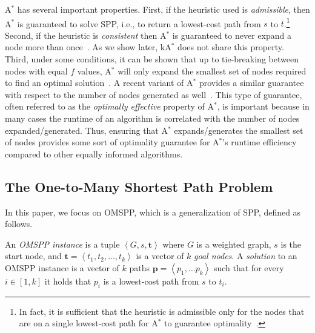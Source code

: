 \documentclass[smallextended]{svjour3}       %
\newcommand{\omspp}{\ac{OMSPP}\xspace}
\newcommand{\spp}{\ac{SPP}\xspace}
\newcommand{\astar}{A$^*$\xspace}
\newcommand{\kastar}{kA$^*$\xspace}
\newcommand{\tuple}[1]{\ensuremath{\left \langle #1 \right \rangle }}
\newcommand{\vect}[1]{\mathbf{#1}}
\newcommand{\roni}[1]{\textbf{[RS:#1]}}
\begin{document}
\astar has several important properties. 
First, if the heuristic used is \emph{admissible}, then \astar is guaranteed to solve SPP, i.e., to return a lowest-cost path from $s$ to $t$.\footnote{In fact, it is sufficient that the heuristic is admissible only for the nodes that are on a single lowest-cost path for \astar to guarantee optimality~\cite{karpas2012optimal,dechter1985generalizedBestFirst}.}
Second, if the heuristic is \emph{consistent} then \astar is guaranteed to never expand a node more than once~\cite{hartNR68Astar}. As we show later, \kastar does not share this property. %
Third, under some conditions, it can be shown that up to tie-breaking between nodes with equal $f$ values, \astar will only expand the smallest set of nodes required to find an optimal solution~\cite{dechter1985generalizedBestFirst}. 
A recent variant of \astar provides a similar guarantee with respect to the number of nodes generated as well~\cite{goldenberg2013optimal}. 
This type of guarantee, often referred to as the \emph{optimally effective} property of \astar, is important because in many cases the runtime of an algorithm is correlated with the number of nodes expanded/generated. 
Thus, ensuring that \astar expands/generates the smallest set of nodes provides some sort of optimality guarantee for \astar's runtime efficiency compared to other equally informed algorithms.



\subsection{The One-to-Many Shortest Path Problem}

In this paper, we focus on \omspp, which is a generalization of \spp, defined as follows. 
\begin{definition}
  \label{def:k-goal}
  An \emph{\omspp instance} is a tuple $\tuple{G, s, \vect{t}}$ where $G$ is a weighted graph, $s$ is the start node, and $\vect{t}=\tuple{t_1, t_2,\ldots, t_k}$ is a vector of $k$ \emph{goal nodes}. %
  A \emph{solution} to an \omspp instance is a vector of $k$ paths $\vect{p}=\tuple{p_1, \ldots p_k}$ such that for every  $i\in [1, k]$ it holds that $p_i$ is a lowest-cost path from $s$ to $t_i$.
\end{definition}
\end{document}
